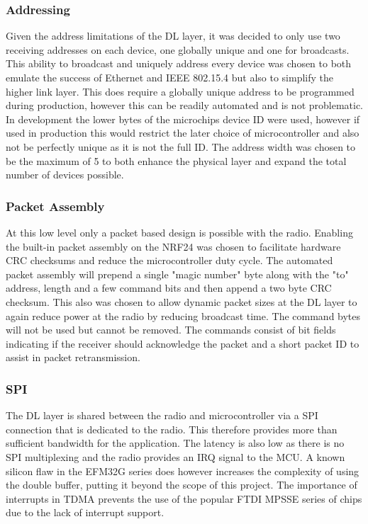 \subsubsection{Addressing}
Given the address limitations of the \ac{DL} layer, it was decided to only use two receiving addresses on
each device, one globally unique and one for broadcasts. This ability to broadcast and uniquely
address every device was chosen to both emulate the success of Ethernet and IEEE 802.15.4 but also
to simplify the higher link layer. This does require a globally unique address to be programmed
during production, however this can be readily automated and is not problematic. In development
the lower bytes of the microchips device ID were used, however if used in production this would
restrict the later choice of microcontroller and also not be perfectly unique as it is not the full ID. The
address width was chosen to be the maximum of 5 to both enhance the physical layer and expand
the total number of devices possible.

\subsubsection{Packet Assembly}
At this low level only a packet based design is possible with the radio. Enabling the built-in packet
assembly on the \ac{NRF24} was chosen to facilitate hardware \ac{CRC} checksums and reduce the
microcontroller duty cycle. The automated packet assembly will prepend a single "magic number"
byte along with the "to" address, length and a few command bits and then append a two byte CRC
checksum. This also was chosen to allow dynamic packet sizes at the \ac{DL} layer to again reduce power
at the radio by reducing broadcast time. The command bytes will not be used but cannot be
removed. The commands consist of bit fields indicating if the receiver should acknowledge the
packet and a short packet ID to assist in packet retransmission.

\subsubsection{\acf{SPI}}
The \ac{DL} layer is shared between the radio and microcontroller via a \ac{SPI} connection that is dedicated
to the radio. This therefore provides more than sufficient bandwidth for the application. The latency
is also low as there is no \ac{SPI} multiplexing and the radio provides an \ac{IRQ} signal to the \ac{MCU}.
A known silicon flaw in the EFM32G series does however increases the complexity of using the
double buffer, putting it beyond the scope of this project\cite{EnergyMicroErata2012}. The importance
of interrupts in \ac{TDMA} prevents the use of the popular FTDI \ac{MPSSE} series of chips due to the lack of
interrupt support.

